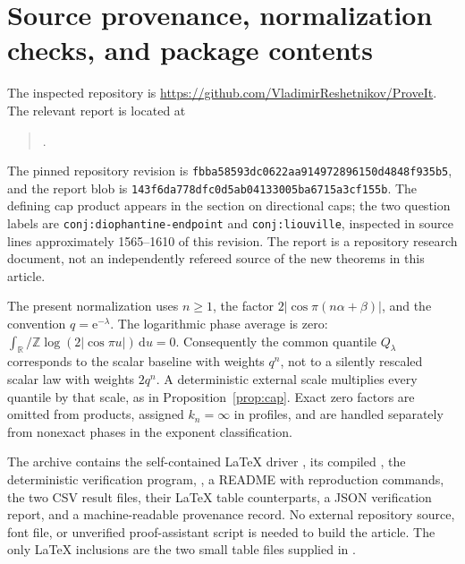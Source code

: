 \documentclass[11pt,a4paper]{article}
\theoremstyle{definition}
\theoremstyle{remark}\newtheorem{remark}[theorem]{Remark}
\newcommand{\T}{\mathbb R/\mathbb Z}
\newcommand{\dd}{\,\mathrm d}
\newcommand{\e}{\mathrm e}
\newcommand{\pinned}{\texttt{fbba58593dc0622aa914972896150d4848f935b5}}
\begin{document}
\appendix
\section{Source provenance, normalization checks, and package contents}
\label{app:provenance}

The inspected repository is \url{https://github.com/VladimirReshetnikov/ProveIt}.
The relevant report is located at
\begin{quote}\small
{}.
\end{quote}
The pinned repository revision is \pinned, and the report blob is
\texttt{143f6da778dfc0d5ab04133005ba6715a3cf155b}.
The defining cap product appears in the section on directional caps; the two
question labels are \texttt{conj:diophantine-endpoint} and
\texttt{conj:liouville}, inspected in source lines approximately
1565--1610 of this revision.  The report is a repository research document,
not an independently refereed source of the new theorems in this article.

The present normalization uses $n\ge1$, the factor
$2|\cos\pi(n\alpha+\beta)|$, and the convention $q=\e^{-\lambda}$.
The logarithmic phase average is zero:
$\int_\T\log(2|\cos\pi u|)\dd u=0$.
Consequently the common quantile $Q_\lambda$ corresponds to the scalar
baseline with weights $q^n$, not to a silently rescaled scalar law with
weights $2q^n$.  A deterministic external scale multiplies every quantile
by that scale, as in Proposition~\ref{prop:cap}.  Exact zero factors are
omitted from products, assigned $k_n=\infty$ in profiles, and are handled
separately from nonexact phases in the exponent classification.

The archive contains the self-contained LaTeX driver , its
compiled , the deterministic verification program,
, a README with reproduction commands, the two CSV
result files, their LaTeX table counterparts, a JSON verification report,
and a machine-readable provenance record.  No external repository source,
font file, or unverified proof-assistant script is needed to build the article.
The only LaTeX inclusions are the two small table files supplied in
.
\end{document}
